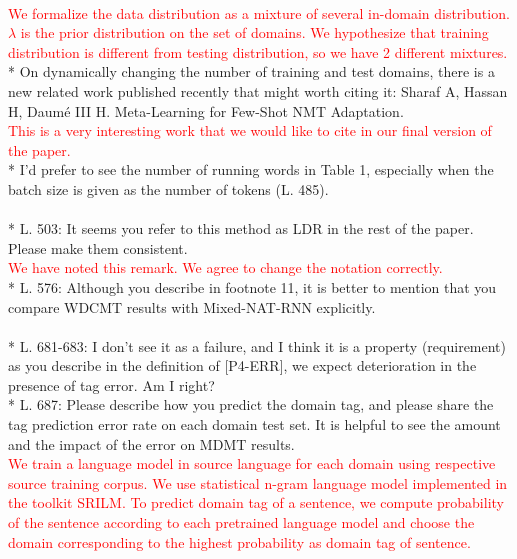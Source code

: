 \documentclass[12pt,times,a4paper,twoside]{article}
\newcommand{\fyTodo}[1]{\Todo[FY:]{\textcolor{orange}{#1}}}
\theoremstyle{definition}
\begin{document}
\\
\textcolor{red}{We formalize the data distribution as a mixture of several in-domain distribution. $\lambda$ is the prior distribution on the set of domains. We hypothesize that training distribution is different from testing distribution, so we have 2 different mixtures.}
\\
* On dynamically changing the number of training and test domains, there is a new related work published recently that might worth citing it: Sharaf A, Hassan H, Daumé III H. Meta-Learning for Few-Shot NMT Adaptation.
\\
\textcolor{red}{This is a very interesting work that we would like to cite in our final version of the paper.}
\\
* I’d prefer to see the number of running words in Table 1, especially when the batch size is given as the number of tokens (L. 485).
\\
\fyTodo{to report number of tokens of the datasets}
\\
* L. 503: It seems you refer to this method as LDR in the rest of the paper. Please make them consistent.
\\
\textcolor{red}{We have noted this remark. We agree to change the notation correctly.}
\\
* L. 576: Although you describe in footnote 11, it is better to mention that you compare WDCMT results with Mixed-NAT-RNN explicitly.
\\
\fyTodo{to explicitly compare WDCNMT with Mixed-NAT-RNN}
\\
* L. 681-683: I don’t see it as a failure, and I think it is a property (requirement) as you describe in the definition of [P4-ERR], we expect deterioration in the presence of tag error. Am I right?
\\
* L. 687: Please describe how you predict the domain tag, and please share the tag prediction error rate on each domain test set. It is helpful to see the amount and the impact of the error on MDMT results.
\\
\textcolor{red}{We train a language model in source language for each domain using respective source training corpus. We use statistical n-gram language model implemented in the toolkit SRILM. To predict domain tag of a sentence, we compute probability of the sentence according to each pretrained language model and choose the domain corresponding to the highest probability as domain tag of sentence.} \fyTodo{to compute error rate of domain prediction over each test set}
\\
\end{document}
